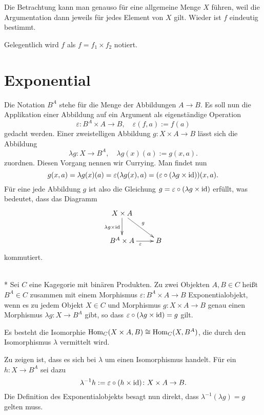 Die Betrachtung kann man genauso für eine allgemeine Menge $X$ führen,
weil die Argumentation dann jeweils für jedes Element von $X$ gilt.
Wieder ist $f$ eindeutig bestimmt.

Gelegentlich wird $f$ als $f=f_1\times f_2$ notiert.

\section{Exponential}

Die Notation $B^A$ stehe für die Menge der Abbildungen $A\to B$.
Es soll nun die Applikation einer Abbildung auf ein Argument
als eigenständige Operation
\[\varepsilon\colon B^A\times A \to B,\quad
\varepsilon(f,a) := f(a)\]
gedacht werden. Einer zweistelligen Abbildung
$g\colon X\times A\to B$ lässt sich die Abbildung
\[\lambda g\colon X\to B^A,\quad \lambda g(x)(a) := g(x,a).\]
zuordnen. Diesen Vorgang nennen wir Currying. Man findet nun
\[g(x,a) = \lambda g(x)(a) = \varepsilon(\lambda g(x),a)
= (\varepsilon\circ (\lambda g\times\operatorname{id}))(x,a).\]
Für eine jede Abbildung $g$ ist also die Gleichung
$g = \varepsilon\circ(\lambda g\times\operatorname{id})$
erfüllt, was bedeutet, dass das Diagramm
\[\xymatrix{
X\times A\ar[dr]^g\ar[d]_{\lambda g\times\id} & \\
B^A\times A \ar[r]_{\varepsilon} & B
}\]
kommutiert.

\begin{Definition}[Exponentialobjekt]\mbox{}\\*
Sei $C$ eine Kagegorie mit binären Produkten. Zu zwei Objekten
$A,B\in C$ heißt $B^A\in C$ zusammen mit einem Morphismus
$\varepsilon\colon B^A\times A\to B$
Exponentialobjekt, wenn es zu jedem Objekt $X\in C$ und Morphismus
$g\colon X\times A\to B$
genau einen Morphismus $\lambda g\colon X\to B^A$ gibt, so dass
$\varepsilon\circ (\lambda g\times\operatorname{id}) = g$ gilt.
\end{Definition}

\begin{Korollar}\label{Exp-Isomorphie}
Es besteht die Isomorphie $\operatorname{Hom}_C(X\times A, B)\cong\operatorname{Hom}_C(X,B^A)$,
die durch den Isomorphismus $\lambda$ vermittelt wird.
\end{Korollar}

\noindent{} Zu zeigen ist, dass es sich bei $\lambda$
um einen Isomorphismus handelt. Für ein $h\colon X\to B^A$ sei dazu
\[\lambda^{-1}h := \varepsilon\circ (h\times\operatorname{id})\colon X\times A\to B.\]
Die Definition des Exponentialobjekts besagt nun direkt, dass
$\lambda^{-1}(\lambda g) = g$ gelten muss.


